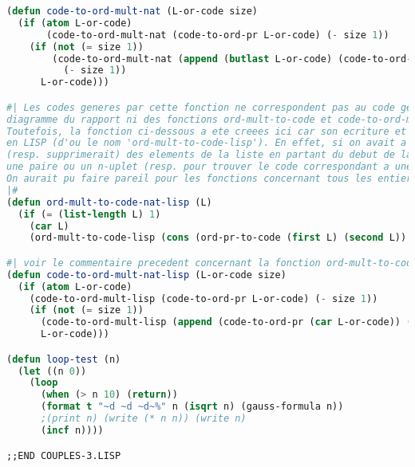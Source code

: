 \documentclass{article}
\begin{document}
\begin{lstlisting}[language=Lisp, basicstyle=\footnotesize]
(defun code-to-ord-mult-nat (L-or-code size)
  (if (atom L-or-code)
       (code-to-ord-mult-nat (code-to-ord-pr L-or-code) (- size 1))
    (if (not (= size 1))
        (code-to-ord-mult-nat (append (butlast L-or-code) (code-to-ord-pr (car (last L-or-code))))
          (- size 1))
      L-or-code)))

#| Les codes generes par cette fonction ne correspondent pas au code genere par le
diagramme du rapport ni des fonctions ord-mult-to-code et code-to-ord-mult. 
Toutefois, la fonction ci-dessous a ete creees ici car son ecriture et beaucoup plus idiomatique
en LISP (d'ou le nom 'ord-mult-to-code-lisp'). En effet, si on avait a coder les nombres naturels en LISP, on ajouterait 
(resp. supprimerait) des elements de la liste en partant du debut de la liste afin de creer
une paire ou un n-uplet (resp. pour trouver le code correspondant a une paire ou un n-uplet.
On aurait pu faire pareil pour les fonctions concernant tous les entiers
|#
(defun ord-mult-to-code-nat-lisp (L)
  (if (= (list-length L) 1)
    (car L)
    (ord-mult-to-code-lisp (cons (ord-pr-to-code (first L) (second L)) (cddr L)))))

#| voir le commentaire precedent concernant la fonction ord-mult-to-code-lisp |#
(defun code-to-ord-mult-nat-lisp (L-or-code size)
  (if (atom L-or-code)
    (code-to-ord-mult-lisp (code-to-ord-pr L-or-code) (- size 1))
    (if (not (= size 1))
      (code-to-ord-mult-lisp (append (code-to-ord-pr (car L-or-code)) (cdr L-or-code)) (- size 1))
      L-or-code)))

(defun loop-test (n)
  (let ((n 0))
    (loop
      (when (> n 10) (return))
      (format t "~d ~d ~d~%" n (isqrt n) (gauss-formula n))
      ;(print n) (write (* n n)) (write n)
      (incf n))))

;;END COUPLES-3.LISP

\end{lstlisting}
\end{document}
